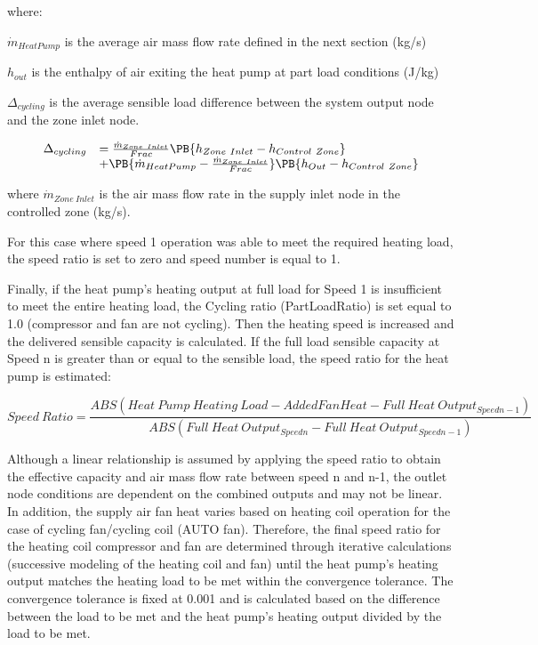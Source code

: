 where:

\({\dot m_{HeatPump}}\) is the average air mass flow rate defined in the next section (kg/s)

\(h_{out}\) is the enthalpy of air exiting the heat pump at part load conditions (J/kg)

\(\Delta_{cycling}\) is the average sensible load difference between the system output node and the zone inlet node.

\begin{equation}
  \begin{array}{rl}
    \Delta_{cycling} &= \frac{\dot{m}_{Zone~Inlet}}{Frac} \PB{h_{Zone~Inlet} - h_{Control~Zone}} \\
                           &+ \PB{\dot{m}_{HeatPump} - \frac{\dot{m}_{Zone~Inlet}}{Frac}} \PB{h_{Out} - h_{Control~Zone}}
  \end{array}
\end{equation}

where \({{{\dot m}_{Zone~Inlet}}}\) is the air mass flow rate in the supply inlet node in the controlled zone (kg/s).

For this case where speed 1 operation was able to meet the required heating load, the speed ratio is set to zero and speed number is equal to 1.

Finally, if the heat pump's heating output at full load for Speed 1 is insufficient to meet the entire heating load, the Cycling ratio (PartLoadRatio) is set equal to 1.0 (compressor and fan are not cycling). Then the heating speed is increased and the delivered sensible capacity is calculated. If the full load sensible capacity at Speed n is greater than or equal to the sensible load, the speed ratio for the heat pump is estimated:

\begin{equation}
Speed~Ratio = \frac{{ABS(Heat~Pump~Heating~Load - AddedFanHeat - Full~Heat~Outpu{t_{Speedn-1}})}}{{ABS(Full~Heat~Outpu{t_{Speedn}} - Full~Heat~Outpu{t_{Speedn-1}})}}
\end{equation}

Although a linear relationship is assumed by applying the speed ratio to obtain the effective capacity and air mass flow rate between speed n and n-1, the outlet node conditions are dependent on the combined outputs and may not be linear. In addition, the supply air fan heat varies based on heating coil operation for the case of cycling fan/cycling coil (AUTO fan). Therefore, the final speed ratio for the heating coil compressor and fan are determined through iterative calculations (successive modeling of the heating coil and fan) until the heat pump's heating output matches the heating load to be met within the convergence tolerance. The convergence tolerance is fixed at 0.001 and is calculated based on the difference between the load to be met and the heat pump's heating output divided by the load to be met.

